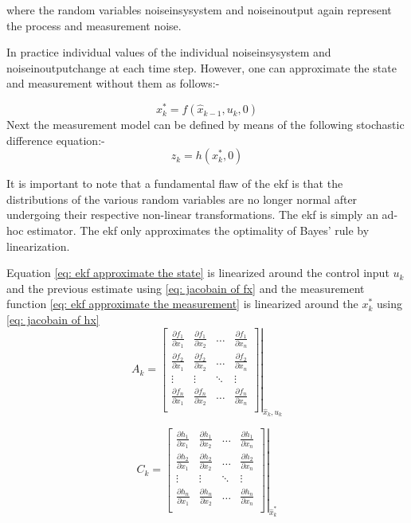 where the random variables \gls{noiseinsysystem} and \gls{noiseinoutput} again represent the process and measurement
noise.



In practice individual values of the individual \gls{noiseinsysystem} and \gls{noiseinoutput}change at each time step. However, one can approximate the state and measurement  without
them as follows:-

\begin{equation}
x_k^* = f(\hat{x}_{k-1},u_k,0) \label{eq: ekf approximate the state}
\end{equation}
Next the measurement model  can be defined by means of the following stochastic difference equation:-
\begin{equation}
z_k = h(x_k^*,0)  \label{eq: ekf approximate the measurement}
\end{equation}

It is important to note that a fundamental flaw of the \gls{ekf} is that the distributions of the various random variables are no longer normal
after undergoing their respective non-linear transformations. The \gls{ekf} is simply an ad-hoc estimator. The \gls{ekf} only approximates the optimality of Bayes’ rule by linearization.


Equation \eqref{eq: ekf approximate the state} is linearized around the control input $u_k$ and the previous estimate using \eqref{eq: jacobain of fx} and the measurement function \eqref{eq: ekf approximate the measurement} is linearized around the $x_k^*$  using  \eqref{eq: jacobain of hx}
\begin{equation}
A_k=\left.\left[\begin{array}{cccc}
\frac{\partial f_{1}}{\partial x_1} &\frac{\partial f_{1}}{\partial x_2} &\dots& \frac{\partial f_{1}}{\partial x_n}\\
\frac{\partial f_{2}}{\partial x_1} &\frac{\partial f_{2}}{\partial x_2} &\dots& \frac{\partial f_{2}}{\partial x_n}\\
\vdots& \vdots& \ddots &\vdots\\
\frac{\partial f_{n}}{\partial x_1} &\frac{\partial f_{n}}{\partial x_2} &\dots&\frac{\partial f_{n}}{\partial x_n} \\
\end{array}\right]\right|_{\hat{x}_k,u_k} \label{eq: jacobain of fx}
\end{equation}

\begin{equation}
C_k=\left.\left[\begin{array}{cccc}
\frac{\partial h_{1}}{\partial x_1} &\frac{\partial h_{1}}{\partial x_2} &\dots& \frac{\partial h_{1}}{\partial x_n}\\
\frac{\partial h_{2}}{\partial x_1} &\frac{\partial h_{2}}{\partial x_2} &\dots& \frac{\partial h_{2}}{\partial x_n}\\
\vdots& \vdots& \ddots &\vdots\\
\frac{\partial h_{n}}{\partial x_1} &\frac{\partial h_{n}}{\partial x_2} &\dots&\frac{\partial h_{n}}{\partial x_n} \\
\end{array}\right]\right|_{\hat{x}_k^*} \label{eq: jacobain of hx}
\end{equation}

